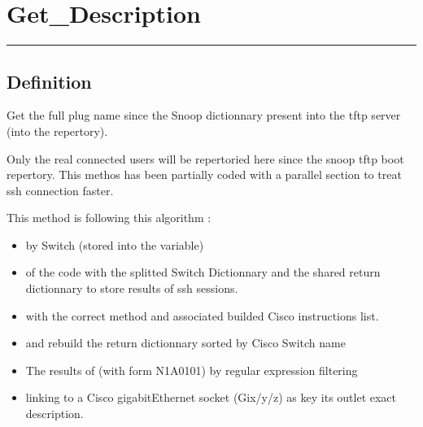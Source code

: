 \documentclass[letterpaper,10pt,english]{sphinxmanual}
\begin{document}
\sphinxstepscope

\newpage
\section{Get\_Description}
\label{\detokenize{OA/Get_Description:get-description}}\label{\detokenize{OA/Get_Description::doc}}
\begin{sphinxVerbatim}[commandchars=\\\{\}]
 
\end{sphinxVerbatim}


\bigskip\hrule\bigskip



\subsection{Definition}
\label{\detokenize{OA/Get_Description:definition}}
\sphinxAtStartPar
Get the full plug name since the Snoop dictionnary present into the tftp server (into the  repertory).

\sphinxAtStartPar
Only the real connected users will be repertoried here since the snoop tftp boot repertory.
This methos has been partially coded with a parallel section to treat ssh connection faster.

\sphinxAtStartPar
This method is following this algorithm :
\begin{itemize}
\item {} 
\sphinxAtStartPar
{} by Switch (stored into the  variable)

\item {} 
\sphinxAtStartPar
{} of the code with the splitted Switch Dictionnary and the shared return dictionnary to store results of ssh sessions.

\item {} 
\sphinxAtStartPar
{} with the correct method  and associated builded Cisco instructions list.

\item {} 
\sphinxAtStartPar
{} and rebuild the return dictionnary sorted by Cisco Switch name

\item {} 
\sphinxAtStartPar
The results of  (with form N1A01\sphinxhyphen{}01) by regular expression filtering

\item {} 
\sphinxAtStartPar
{} linking to a Cisco gigabitEthernet socket (Gix/y/z) as key its outlet exact description.

\end{itemize}
\end{document}
